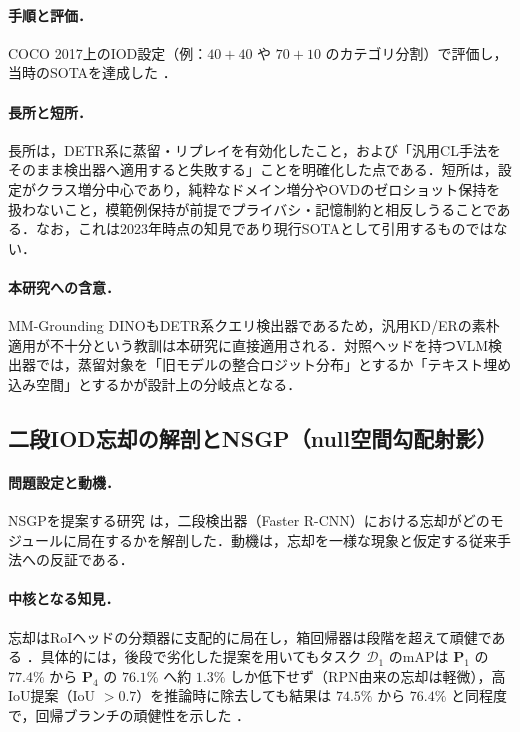 \paragraph{手順と評価．}
COCO 2017上のIOD設定（例：$40+40$ や $70+10$ のカテゴリ分割）で評価し，当時のSOTAを達成した \cite{cldetr}．

\paragraph{長所と短所．}
長所は，DETR系に蒸留・リプレイを有効化したこと，および「汎用CL手法をそのまま検出器へ適用すると失敗する」ことを明確化した点である．短所は，設定がクラス増分中心であり，純粋なドメイン増分やOVDのゼロショット保持を扱わないこと，模範例保持が前提でプライバシ・記憶制約と相反しうることである．なお，これは2023年時点の知見であり現行SOTAとして引用するものではない．

\paragraph{本研究への含意．}
MM-Grounding DINOもDETR系クエリ検出器であるため，汎用KD/ERの素朴適用が不十分という教訓は本研究に直接適用される．対照ヘッドを持つVLM検出器では，蒸留対象を「旧モデルの整合ロジット分布」とするか「テキスト埋め込み空間」とするかが設計上の分岐点となる．


\subsection{二段IOD忘却の解剖とNSGP（null空間勾配射影）}
\label{subsec:nsgp}

\paragraph{問題設定と動機．}
NSGPを提案する研究 \cite{nsgp} は，二段検出器（Faster R-CNN）における忘却がどのモジュールに局在するかを解剖した．動機は，忘却を一様な現象と仮定する従来手法への反証である．

\paragraph{中核となる知見．}
忘却はRoIヘッドの分類器に支配的に局在し，箱回帰器は段階を超えて頑健である \cite{nsgp}．具体的には，後段で劣化した提案を用いてもタスク $\mathcal{D}_{1}$ のmAPは $\mathbf{P}_{1}$ の $77.4\%$ から $\mathbf{P}_{4}$ の $76.1\%$ へ約 $1.3\%$ しか低下せず（RPN由来の忘却は軽微），高IoU提案（IoU $> 0.7$）を推論時に除去しても結果は $74.5\%$ から $76.4\%$ と同程度で，回帰ブランチの頑健性を示した \cite{nsgp}．


